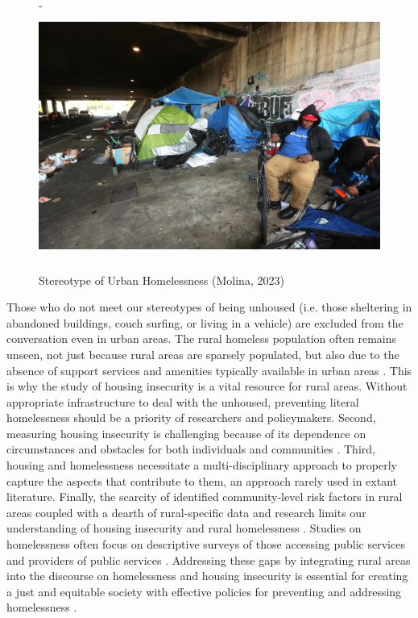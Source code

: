 \begin{figure}[htbp] 

    \centering 
    -
    \includegraphics[width=\textwidth, height=8cm]{plots/homeless.jpeg} 
    
    \caption[Stereotype of Urban Homelessness]{Stereotype of Urban Homelessness (Molina, 2023)} 
    
    \label{fig:urban_homeless} 
    
\end{figure} 

\pagebreak

Those who do not meet our stereotypes of being unhoused (i.e. those sheltering in abandoned buildings, couch surfing, or living in a vehicle) are excluded from the conversation even in urban areas. The rural homeless population often remains unseen, not just because rural areas are sparsely populated, but also due to the absence of support services and amenities typically available in urban areas \citep{cloke_handbook_2006}. This is why the study of housing insecurity is a vital resource for rural areas. Without appropriate infrastructure to deal with the unhoused, preventing literal homelessness should be a priority of researchers and policymakers. Second, measuring housing insecurity is challenging because of its dependence on circumstances and obstacles for both individuals and communities \citep{leifheit_building_2022}. Third, housing and homelessness necessitate a multi-disciplinary approach to properly capture the aspects that contribute to them, an approach rarely used in extant literature. Finally, the scarcity of identified community-level risk factors in rural areas coupled with a dearth of rural-specific data and research limits our understanding of housing insecurity and rural homelessness \citep{gleason_using_2021}. Studies on homelessness often focus on descriptive surveys of those accessing public services and providers of public services \citep{robertson_rural_2007}. Addressing these gaps by integrating rural areas into the discourse on homelessness and housing insecurity is essential for creating a just and equitable society with effective policies for preventing and addressing homelessness \citep{oregan_how_2021}. 

